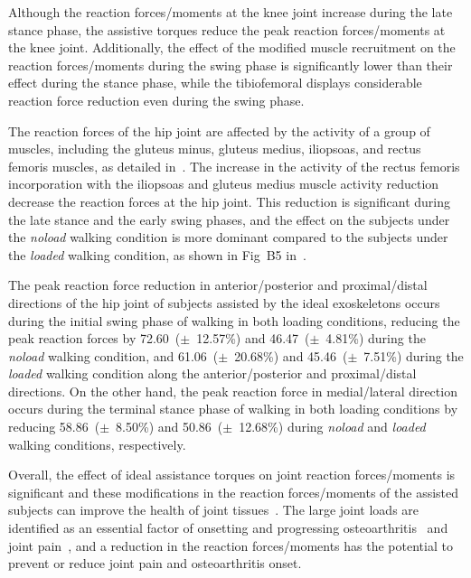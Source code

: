 \documentclass[10pt,letterpaper]{article}
\begin{document}
Although the reaction forces/moments at the knee joint increase during the late stance phase, the assistive torques reduce the peak reaction forces/moments at the knee joint. Additionally, the effect of the modified muscle recruitment on the reaction forces/moments during the swing phase is significantly lower than their effect during the stance phase, while the tibiofemoral displays considerable reaction force reduction even during the swing phase.


The reaction forces of the hip joint are affected by the activity of a group of muscles, including the gluteus minus, gluteus medius, iliopsoas, and rectus femoris muscles, as detailed in~\cite{VanVeen2019}. The increase in the activity of the rectus femoris incorporation with the iliopsoas and gluteus medius muscle activity reduction decrease the reaction forces at the hip joint. This reduction is significant during the late stance and the early swing phases, and the effect on the subjects under the \emph{noload} walking condition is more dominant compared to the subjects under the \emph{loaded} walking condition, as shown in Fig~B5 in~.

The peak reaction force reduction in anterior/posterior and proximal/distal directions of the hip joint of subjects assisted by the ideal exoskeletons occurs during the initial swing phase of walking in both loading conditions, reducing the peak reaction forces by 72.60~($\pm$~12.57\%) and 46.47~($\pm$~4.81\%) during the \emph{noload} walking condition, and 61.06~($\pm$~20.68\%) and 45.46~($\pm$~7.51\%) during the \emph{loaded} walking condition along the anterior/posterior and proximal/distal directions. On the other hand, the peak reaction force in medial/lateral direction occurs during the terminal stance phase of walking in both loading conditions by reducing 58.86~($\pm$~8.50\%) and 50.86~($\pm$~12.68\%) during \emph{noload} and \emph{loaded} walking conditions, respectively.

Overall, the effect of ideal assistance torques on joint reaction forces/moments is significant and these modifications in the reaction forces/moments of the assisted subjects can improve the health of joint tissues~\cite{Carter1988}. The large joint loads are identified as an essential factor of onsetting and progressing osteoarthritis~\cite{Baliunas2002,Sharma1998} and joint pain~\cite{Schnitzer1993}, and a reduction in the reaction forces/moments has the potential to prevent or reduce joint pain and osteoarthritis onset.
\end{document}

